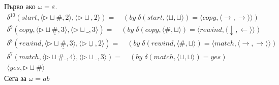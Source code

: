 \documentclass[14pt]{extarticle}
\begin{document}
Първо ако \(\omega = \varepsilon\).
\begin{align*}
    \delta^{10}(start, \langle \triangleright \underline{\sqcup}\#, 2 \rangle, \langle \triangleright \underline{\sqcup}, 2 \rangle) = \quad (by\; \delta(start, \langle \sqcup, \sqcup \rangle) = \langle copy, \langle \rightarrow, \rightarrow \rangle \rangle) \\
    \delta^{9}(copy, \langle \triangleright \sqcup\underline{\#}, 3 \rangle, \langle \triangleright \sqcup\_, 3 \rangle) = \quad (by\; \delta(copy, \langle \#, \sqcup \rangle) = \langle rewind, \langle \downarrow, \leftarrow \rangle \rangle ) \\
    \delta^{8}(rewind, \langle \triangleright \sqcup \underline{\#}, 3 \rangle, \langle \triangleright \underline{\sqcup}, 2 \rangle) = \quad (by\; \delta(rewind, \langle \#, \sqcup \rangle) = \langle match, \langle \rightarrow, \rightarrow \rangle \rangle ) \\
    \delta^7(match, \langle \triangleright \sqcup \#\_, 4 \rangle, \langle \triangleright \sqcup\_, 3 \rangle) = \quad (by\; \delta(match, \langle \sqcup, \sqcup \rangle) = yes ) \\
    \langle yes, \triangleright \sqcup\# \rangle
\end{align*}
Сега за \(\omega = ab\)
\end{document}
